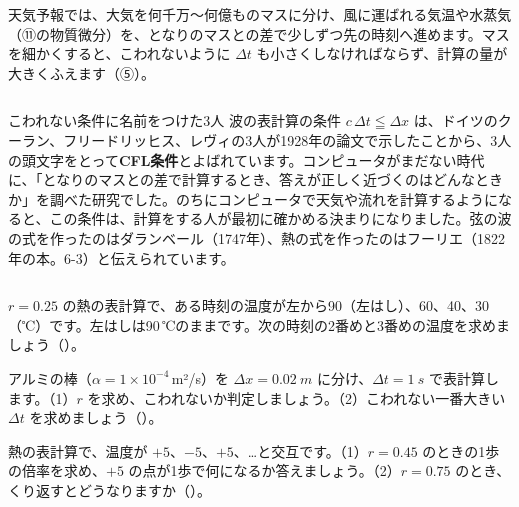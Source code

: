 \begin{butsuri}
\begin{itemize}[leftmargin=1.2\zw, itemsep=3pt, topsep=0pt, label={\color{\bkTT}●}]
\begin{minipage}[c]{0.74\linewidth}
天気予報では、大気を何千万〜何億ものマスに分け、風に運ばれる気温や水蒸気（⑪の物質微分）を、となりのマスとの差で少しずつ先の時刻へ進めます。マスを細かくすると、こわれないように $\Delta t$ も小さくしなければならず、計算の量が大きくふえます（⑤）。
\end{minipage}\hfill
\begin{minipage}[c]{0.22\linewidth}\centering
{}
\end{minipage}
\end{itemize}
\end{butsuri}

\begin{column}{こわれない条件に名前をつけた3人}
波の表計算の条件 $c\,\Delta t\leqq\Delta x$ は、ドイツのクーラン、フリードリッヒス、レヴィの3人が1928年の論文で示したことから、3人の頭文字をとって\textbf{CFL条件}とよばれています。コンピュータがまだない時代に、「となりのマスとの差で計算するとき、答えが正しく近づくのはどんなときか」を調べた研究でした。のちにコンピュータで天気や流れを計算するようになると、この条件は、計算をする人が最初に確かめる決まりになりました。弦の波の式を作ったのはダランベール（1747年）、熱の式を作ったのはフーリエ（1822年の本。6-3）と伝えられています。
\end{column}

\bkendproblems
{}

\bkproblem $r=0.25$ の熱の表計算で、ある時刻の温度が左から90（左はし）、60、40、30（℃）です。左はしは90\,℃のままです。次の時刻の2番めと3番めの温度を求めましょう\mbox{（）}。

\bkproblem アルミの棒（$\alpha=1\times10^{-4}$\,m²/s）を $\Delta x=\qty{0.02}{m}$ に分け、$\Delta t=\qty{1}{s}$ で表計算します。（1）$r$ を求め、こわれないか判定しましょう。（2）こわれない一番大きい $\Delta t$ を求めましょう\mbox{（）}。

\bkproblem 熱の表計算で、温度が $+5$、$-5$、$+5$、…と交互です。（1）$r=0.45$ のときの1歩の倍率を求め、$+5$ の点が1歩で何になるか答えましょう。（2）$r=0.75$ のとき、くり返すとどうなりますか\mbox{（）}。

